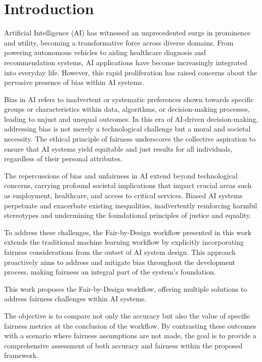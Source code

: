\chapter{Introduction}
\label{chap:introduction}

Artificial Intelligence (AI) has witnessed an unprecedented surge in prominence and utility, becoming a transformative force across diverse domains. From powering autonomous vehicles to aiding healthcare diagnosis and recommendation systems, AI applications have become increasingly integrated into everyday life. However, this rapid proliferation has raised concerns about the pervasive presence of bias within AI systems.

Bias in AI refers to inadvertent or systematic preferences shown towards specific groups or characteristics within data, algorithms, or decision-making processes, leading to unjust and unequal outcomes. In this era of AI-driven decision-making, addressing bias is not merely a technological challenge but a moral and societal necessity. The ethical principle of fairness underscores the collective aspiration to ensure that AI systems yield equitable and just results for all individuals, regardless of their personal attributes.

The repercussions of bias and unfairness in AI extend beyond technological concerns, carrying profound societal implications that impact crucial areas such as employment, healthcare, and access to critical services. Biased AI systems perpetuate and exacerbate existing inequalities, inadvertently reinforcing harmful stereotypes and undermining the foundational principles of justice and equality.

To address these challenges, the Fair-by-Design workflow presented in this work extends the traditional machine learning workflow by explicitly incorporating fairness considerations from the outset of AI system design. This approach proactively aims to address and mitigate bias throughout the development process, making fairness an integral part of the system's foundation.

This work proposes the Fair-by-Design workflow, offering multiple solutions to address fairness challenges within AI systems. 

The objective is to compare not only the accuracy but also the value of specific fairness metrics at the conclusion of the workflow. By contrasting these outcomes with a scenario where fairness assumptions are not made, the goal is to provide a comprehensive assessment of both accuracy and fairness within the proposed framework.

